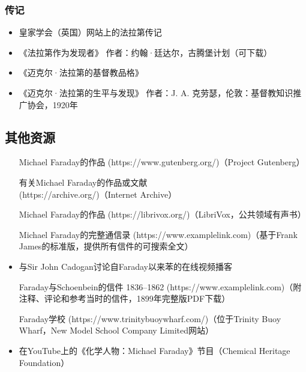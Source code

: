 \subsubsection{传记}
\begin{itemize}
\item 皇家学会（英国）网站上的法拉第传记
\item 《法拉第作为发现者》 作者：约翰·廷达尔，古腾堡计划（可下载）
\item 《迈克尔·法拉第的基督教品格》
\item 《迈克尔·法拉第的生平与发现》 作者：J. A. 克劳瑟，伦敦：基督教知识推广协会，1920年
\end{itemize}
\subsection{其他资源}  
\begin{itemize}
\item [Michael Faraday的作品](https://www.gutenberg.org/)（Project Gutenberg）  
\item [有关Michael Faraday的作品或文献](https://archive.org/)（Internet Archive）  
\item [Michael Faraday的作品](https://librivox.org/)（LibriVox，公共领域有声书）  
\item [Michael Faraday的完整通信录](https://www.examplelink.com)（基于Frank James的标准版，提供所有信件的可搜索全文）  
\item 与Sir John Cadogan讨论自Faraday以来苯的在线视频播客  
\item [Faraday与Schoenbein的信件 1836–1862](https://www.examplelink.com)（附注释、评论和参考当时的信件，1899年完整版PDF下载）  
\item [Faraday学校](https://www.trinitybuoywharf.com/)（位于Trinity Buoy Wharf，New Model School Company Limited网站）  
\item 在YouTube上的《化学人物：Michael Faraday》节目（Chemical Heritage Foundation）
\end{itemize}
